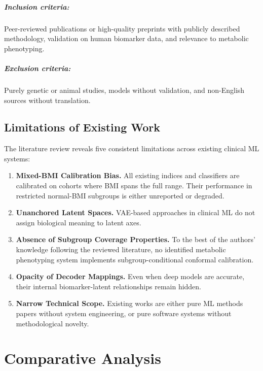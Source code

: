 \documentclass[12pt,a4paper,oneside]{report}
\begin{document}
\paragraph{Inclusion criteria:} Peer-reviewed publications or high-quality preprints with publicly described methodology, validation on human biomarker data, and relevance to metabolic phenotyping.

\paragraph{Exclusion criteria:} Purely genetic or animal studies, models without validation, and non-English sources without translation.

\section{Limitations of Existing Work}

The literature review reveals five consistent limitations across existing clinical ML systems:

\begin{enumerate}[leftmargin=*]
    \item \textbf{Mixed-BMI Calibration Bias.} All existing indices and classifiers are calibrated on cohorts where BMI spans the full range. Their performance in restricted normal-BMI subgroups is either unreported or degraded.
    \item \textbf{Unanchored Latent Spaces.} VAE-based approaches in clinical ML do not assign biological meaning to latent axes.
    \item \textbf{Absence of Subgroup Coverage Properties.} To the best of the authors' knowledge following the reviewed literature, no identified metabolic phenotyping system implements subgroup-conditional conformal calibration.
    \item \textbf{Opacity of Decoder Mappings.} Even when deep models are accurate, their internal biomarker-latent relationships remain hidden.
    \item \textbf{Narrow Technical Scope.} Existing works are either pure ML methods papers without system engineering, or pure software systems without methodological novelty.
\end{enumerate}

\chapter{Comparative Analysis}
\end{document}
